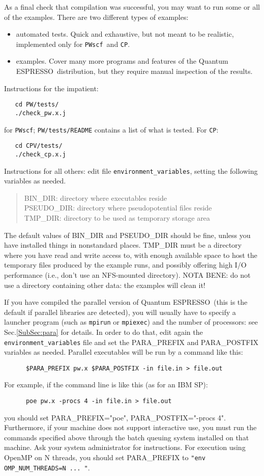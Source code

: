 \documentclass[12pt,a4paper]{article}
\def\qe{{\sc Quantum ESPRESSO}}
\def\PWscf{\texttt{PWscf}}
\def\CP{\texttt{CP}}
\begin{document}
As a final check that compilation was successful, you may want to run some or
all of the examples. There are two different types of examples: 
\begin{itemize}
\item automated tests. Quick and exhaustive, but not
meant to be realistic, implemented only for \PWscf\ and \CP.
\item examples.
Cover many more programs and features of the \qe\ distribution,
but they require manual inspection of the results. 
\end{itemize}
Instructions for the impatient:
\begin{verbatim}
   cd PW/tests/
   ./check_pw.x.j
\end{verbatim}
for \PWscf;
\texttt{PW/tests/README} contains a list of what is tested.
For \CP:
\begin{verbatim}
   cd CPV/tests/
   ./check_cp.x.j
\end{verbatim}
Instructions for all others: edit file \texttt{environment\_variables},
setting the following variables as needed.
\begin{quote}
   BIN\_DIR: directory where executables reside\\
   PSEUDO\_DIR: directory where pseudopotential files reside\\
   TMP\_DIR: directory to be used as temporary storage area
\end{quote}
The default values of BIN\_DIR and PSEUDO\_DIR should be fine, 
unless you have installed things in nonstandard places. TMP\_DIR 
must be a directory where you have read and write access to, with 
enough available space to host the temporary files produced by the 
example runs, and possibly offering high I/O performance (i.e., don't 
use an NFS-mounted directory). NOTA BENE: do not use a
directory containing other data: the examples will clean it!

If you have compiled the parallel version of \qe\ (this
is the default if parallel libraries are detected), you will usually
have to specify a launcher program (such as \texttt{mpirun} or 
\texttt{mpiexec}) and the number of processors: see Sec.\ref{SubSec:para} for
details. In order to do that, edit again the \texttt{environment\_variables} 
file
and set the PARA\_PREFIX and PARA\_POSTFIX variables as needed. 
Parallel executables will be run by a command like this: 
\begin{verbatim}
      $PARA_PREFIX pw.x $PARA_POSTFIX -in file.in > file.out
\end{verbatim}
For example, if the command line is like this (as for an IBM SP):
\begin{verbatim}
      poe pw.x -procs 4 -in file.in > file.out
\end{verbatim}
you should set PARA\_PREFIX="poe", PARA\_POSTFIX="-procs
4". Furthermore, if your machine does not support interactive use, you
must run the commands specified above through the batch queuing
system installed on that machine. Ask your system administrator for
instructions. For execution using OpenMP on N threads, 
you should set PARA\_PREFIX to \texttt{"env OMP\_NUM\_THREADS=N ... "}.
\end{document}
